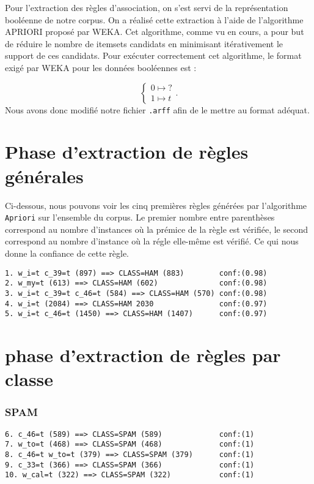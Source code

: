 
Pour l'extraction des règles d'association, on s'est servi de la représentation booléenne de notre corpus. On a réalisé cette extraction à l'aide de l'algorithme APRIORI proposé par WEKA. Cet algorithme, comme vu en cours, a pour but de réduire le nombre de itemsets candidats en minimisant itérativement le support de ces candidats. Pour exécuter correctement cet algorithme, le format exigé par WEKA pour les données booléennes est : 

\begin{displaymath}
\begin{cases}
      0 \mapsto ? \\
      1 \mapsto t
\end{cases}.
\end{displaymath} 
Nous avons donc modifié notre fichier \texttt{.arff} afin de le mettre au format adéquat. 



\section{Phase d'extraction de règles générales}

Ci-dessous, nous pouvons voir les cinq premières règles générées par l'algorithme \texttt{Apriori} sur l'ensemble du corpus. Le premier nombre entre parenthèses correspond au nombre d'instances où la prémice de la règle est vérifiée, le second correspond au nombre d'instance où la régle elle-même est vérifié. Ce qui nous donne la confiance de cette règle. 

\begin{verbatim}
1. w_i=t c_39=t (897) ==> CLASS=HAM (883)        conf:(0.98)
2. w_my=t (613) ==> CLASS=HAM (602)              conf:(0.98)
3. w_i=t c_39=t c_46=t (584) ==> CLASS=HAM (570) conf:(0.98)
4. w_i=t (2084) ==> CLASS=HAM 2030               conf:(0.97)
5. w_i=t c_46=t (1450) ==> CLASS=HAM (1407)      conf:(0.97)
\end{verbatim}

\section{phase d'extraction de règles par classe}

\subsubsection{SPAM}

\begin{verbatim}
6. c_46=t (589) ==> CLASS=SPAM (589)             conf:(1)
7. w_to=t (468) ==> CLASS=SPAM (468)             conf:(1)
8. c_46=t w_to=t (379) ==> CLASS=SPAM (379)      conf:(1)
9. c_33=t (366) ==> CLASS=SPAM (366)             conf:(1)
10. w_cal=t (322) ==> CLASS=SPAM (322)           conf:(1)
\end{verbatim}

